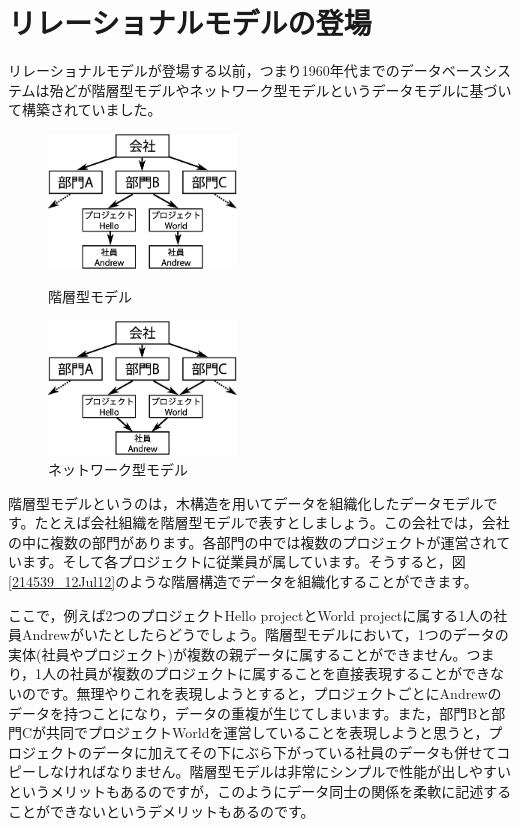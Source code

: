 \section{リレーショナルモデルの登場}


リレーショナルモデルが登場する以前，つまり1960年代までのデータベースシステムは殆どが階層型モデルやネットワーク型モデルというデータモデルに基づいて構築されていました。


\begin{figure}[tb]
 \begin{minipage}{0.48\textwidth}
  \begin{center}
   \includegraphics[width=5cm]{hayamiz/images/hierarchical-data-model.eps}
   \caption{階層型モデル}
   \label{214539_12Jul12}
  \end{center}
 \end{minipage}
 \begin{minipage}{0.48\textwidth}
  \begin{center}
   \includegraphics[width=5cm]{hayamiz/images/network-data-model.eps}
   \caption{ネットワーク型モデル}
   \label{214707_12Jul12}
  \end{center}
 \end{minipage}
 \vspace*{-0.1\Cvs}
\end{figure}


階層型モデルというのは，木構造を用いてデータを組織化したデータモデルです。たとえば会社組織を階層型モデルで表すとしましょう。この会社では，会社の中に複数の部門があります。各部門の中では複数のプロジェクトが運営されています。そして各プロジェクトに従業員が属しています。そうすると，図\ref{214539_12Jul12}のような階層構造でデータを組織化することができます。


ここで，例えば2つのプロジェクトHello projectとWorld projectに属する1人の社員Andrewがいたとしたらどうでしょう。階層型モデルにおいて，1つのデータの実体(社員やプロジェクト)が複数の親データに属することができません。つまり，1人の社員が複数のプロジェクトに属することを直接表現することができないのです。無理やりこれを表現しようとすると，プロジェクトごとにAndrewのデータを持つことになり，データの重複が生じてしまいます。また，部門Bと部門Cが共同でプロジェクトWorldを運営していることを表現しようと思うと，プロジェクトのデータに加えてその下にぶら下がっている社員のデータも併せてコピーしなければなりません。階層型モデルは非常にシンプルで性能が出しやすいというメリットもあるのですが，このようにデータ同士の関係を柔軟に記述することができないというデメリットもあるのです。


